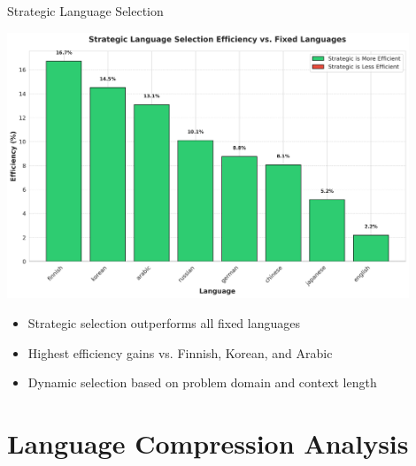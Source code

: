 \documentclass{beamer}
\begin{document}
\begin{frame}{Strategic Language Selection}
    \begin{center}
        \includegraphics[width=0.9\textwidth]{visualizations/presentation/strategic_selection_efficiency.png}
    \end{center}
    
    \begin{itemize}
        \item Strategic selection outperforms all fixed languages
        \item Highest efficiency gains vs. Finnish, Korean, and Arabic
        \item Dynamic selection based on problem domain and context length
    \end{itemize}
\end{frame}

\section{Language Compression Analysis}
\end{document}
